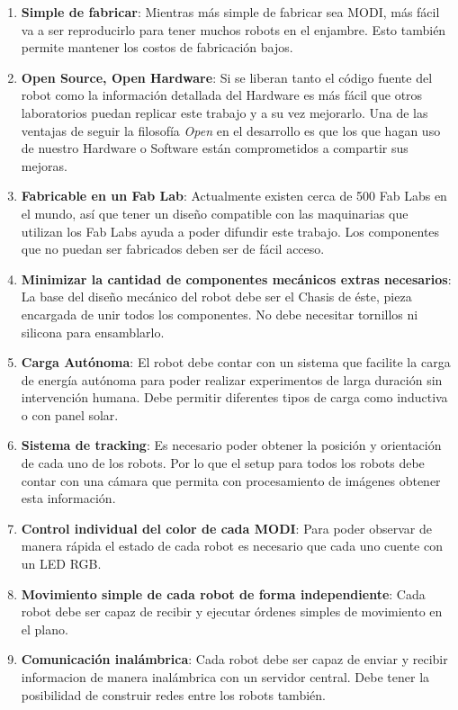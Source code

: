 \begin{enumerate}
\item \textbf{Simple de fabricar}: Mientras más simple de fabricar sea MODI, más fácil va a ser reproducirlo para tener muchos robots en el enjambre. Esto también permite mantener los costos de fabricación bajos. 
\item \textbf{Open Source, Open Hardware}: Si se liberan tanto el código fuente del robot como la información detallada del Hardware es más fácil que otros laboratorios puedan replicar este trabajo y a su vez mejorarlo. Una de las ventajas de seguir la filosofía \textit{Open} en el desarrollo es que los que hagan uso de nuestro Hardware o Software están comprometidos a compartir sus mejoras.
\item \textbf{Fabricable en un Fab Lab}: Actualmente existen cerca de 500 Fab Labs en el mundo, así que tener un diseño compatible con las maquinarias que utilizan los Fab Labs ayuda a poder difundir este trabajo. Los componentes que no puedan ser fabricados deben ser de fácil acceso.
\item \textbf{Minimizar la cantidad de componentes mecánicos extras necesarios}: La base del diseño mecánico del robot debe ser el Chasis de éste, pieza encargada de unir todos los componentes. No debe necesitar tornillos ni silicona para ensamblarlo.
\item \textbf{Carga Autónoma}: El robot debe contar con un sistema que facilite la carga de energía autónoma para poder realizar experimentos de larga duración sin intervención humana. Debe permitir diferentes tipos de carga como inductiva o con panel solar.
\item \textbf{Sistema de tracking}: Es necesario poder obtener la posición y orientación de cada uno de los robots. Por lo que el setup para todos los robots debe contar con una cámara que permita con procesamiento de imágenes obtener esta información.
\item \textbf{Control individual del color de cada MODI}: Para poder observar de manera rápida el estado de cada robot es necesario que cada uno cuente con un LED RGB.
\item \textbf{Movimiento simple de cada robot de forma independiente}: Cada robot debe ser capaz de recibir y ejecutar órdenes simples de movimiento en el plano.
\item \textbf{Comunicación inalámbrica}: Cada robot debe ser capaz de enviar y recibir informacion de manera inalámbrica con un servidor central. Debe tener la posibilidad de construir redes entre los robots también.
\end{enumerate}


